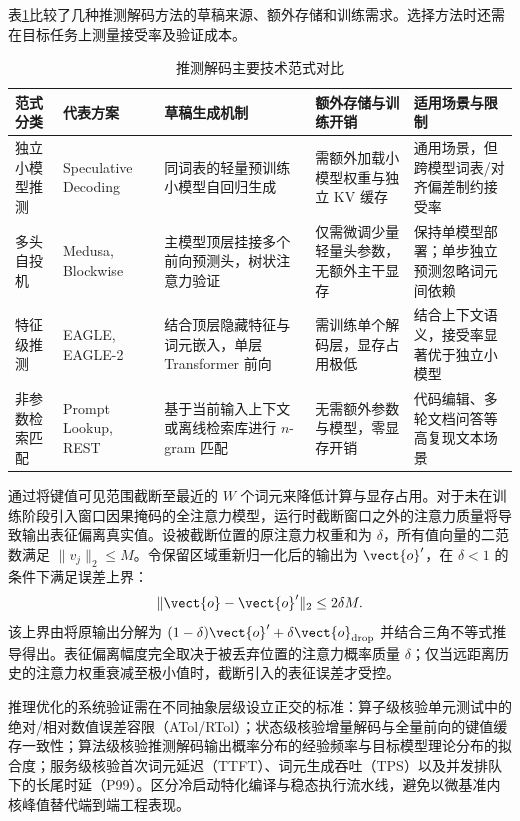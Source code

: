 \documentclass[../textbook.tex]{subfiles}
\begin{document}
表\ref{tab:speculative-decoding}比较了几种推测解码方法的草稿来源、额外存储和训练需求。选择方法时还需在目标任务上测量接受率及验证成本。

\begin{table}[htbp]
\centering
\caption{推测解码主要技术范式对比}\label{tab:speculative-decoding}
\begin{tabularx}{\linewidth}{@{}lXXXX@{}}
\toprule
范式分类 & 代表方案 & 草稿生成机制 & 额外存储与训练开销 & 适用场景与限制 \\
\midrule
独立小模型推测 & Speculative Decoding\autocite{leviathan2023speculative} & 同词表的轻量预训练小模型自回归生成 & 需额外加载小模型权重与独立 KV 缓存 & 通用场景，但跨模型词表/对齐偏差制约接受率 \\
多头自投机 & Medusa, Blockwise & 主模型顶层挂接多个前向预测头，树状注意力验证 & 仅需微调少量轻量头参数，无额外主干显存 & 保持单模型部署；单步独立预测忽略词元间依赖 \\
特征级推测 & EAGLE, EAGLE-2 & 结合顶层隐藏特征与词元嵌入，单层 Transformer 前向 & 需训练单个解码层，显存占用极低 & 结合上下文语义，接受率显著优于独立小模型 \\
非参数检索匹配 & Prompt Lookup, REST & 基于当前输入上下文或离线检索库进行 $n$-gram 匹配 & 无需额外参数与模型，零显存开销 & 代码编辑、多轮文档问答等高复现文本场景 \\
\bottomrule
\end{tabularx}
\end{table}

通过将键值可见范围截断至最近的 $W$ 个词元来降低计算与显存占用。对于未在训练阶段引入窗口因果掩码的全注意力模型，运行时截断窗口之外的注意力质量将导致输出表征偏离真实值。设被截断位置的原注意力权重和为 $\delta$，所有值向量的二范数满足 $\|v_j\|_2\le M$。令保留区域重新归一化后的输出为 $\vect{o}'$，在 $\delta<1$ 的条件下满足误差上界：
\begin{equation}
 \|\vect{o}-\vect{o}'\|_2\le 2\delta M.
\end{equation}
该上界由将原输出分解为 $(1-\delta)\vect{o}'+\delta\vect{o}_{\mathrm{drop}}$ 并结合三角不等式推导得出。表征偏离幅度完全取决于被丢弃位置的注意力概率质量 $\delta$；仅当远距离历史的注意力权重衰减至极小值时，截断引入的表征误差才受控。

推理优化的系统验证需在不同抽象层级设立正交的标准：算子级核验单元测试中的绝对/相对数值误差容限（ATol/RTol）；状态级核验增量解码与全量前向的键值缓存一致性；算法级核验推测解码输出概率分布的经验频率与目标模型理论分布的拟合度；服务级核验首次词元延迟（TTFT）、词元生成吞吐（TPS）以及并发排队下的长尾时延（P99）。区分冷启动特化编译与稳态执行流水线，避免以微基准内核峰值替代端到端工程表现。




\chapterreferences
\myendchapterdocument
\end{document}
